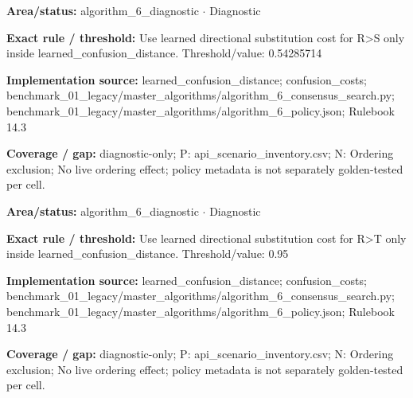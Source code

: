 \begin{tcolorbox}[enhanced,breakable,colback=white,colframe=Muted!45,boxrule=0.45pt,arc=1.5pt,left=6pt,right=6pt,top=5pt,bottom=5pt,title={\texttt{A6-LEARNED-SUBSTITUTION-R-S}},title after break={\texttt{A6-LEARNED-SUBSTITUTION-R-S}\ (continued)},fonttitle=\headingfont\bfseries\color{Navy},coltitle=Navy]
\textbf{Area/status:} algorithm\_\allowbreak{}6\_\allowbreak{}diagnostic $\boldsymbol{\cdot}$ Diagnostic\par
\smallskip
\textbf{Exact rule / threshold:} Use learned directional substitution cost for R>S only inside learned\_\allowbreak{}confusion\_\allowbreak{}distance. Threshold/\allowbreak{}value: 0.54285714\par
\smallskip
\textbf{Implementation source:} learned\_\allowbreak{}confusion\_\allowbreak{}distance; confusion\_\allowbreak{}costs; benchmark\_\allowbreak{}01\_\allowbreak{}legacy/\allowbreak{}master\_\allowbreak{}algorithms/\allowbreak{}algorithm\_\allowbreak{}6\_\allowbreak{}consensus\_\allowbreak{}search.py; benchmark\_\allowbreak{}01\_\allowbreak{}legacy/\allowbreak{}master\_\allowbreak{}algorithms/\allowbreak{}algorithm\_\allowbreak{}6\_\allowbreak{}policy.json; Rulebook 14.3\par
\smallskip
\textbf{Coverage / gap:} diagnostic-only; P: api\_\allowbreak{}scenario\_\allowbreak{}inventory.csv; N: Ordering exclusion; No live ordering effect; policy metadata is not separately golden-tested per cell.
\end{tcolorbox}
\begin{tcolorbox}[enhanced,breakable,colback=white,colframe=Muted!45,boxrule=0.45pt,arc=1.5pt,left=6pt,right=6pt,top=5pt,bottom=5pt,title={\texttt{A6-LEARNED-SUBSTITUTION-R-T}},title after break={\texttt{A6-LEARNED-SUBSTITUTION-R-T}\ (continued)},fonttitle=\headingfont\bfseries\color{Navy},coltitle=Navy]
\textbf{Area/status:} algorithm\_\allowbreak{}6\_\allowbreak{}diagnostic $\boldsymbol{\cdot}$ Diagnostic\par
\smallskip
\textbf{Exact rule / threshold:} Use learned directional substitution cost for R>T only inside learned\_\allowbreak{}confusion\_\allowbreak{}distance. Threshold/\allowbreak{}value: 0.95\par
\smallskip
\textbf{Implementation source:} learned\_\allowbreak{}confusion\_\allowbreak{}distance; confusion\_\allowbreak{}costs; benchmark\_\allowbreak{}01\_\allowbreak{}legacy/\allowbreak{}master\_\allowbreak{}algorithms/\allowbreak{}algorithm\_\allowbreak{}6\_\allowbreak{}consensus\_\allowbreak{}search.py; benchmark\_\allowbreak{}01\_\allowbreak{}legacy/\allowbreak{}master\_\allowbreak{}algorithms/\allowbreak{}algorithm\_\allowbreak{}6\_\allowbreak{}policy.json; Rulebook 14.3\par
\smallskip
\textbf{Coverage / gap:} diagnostic-only; P: api\_\allowbreak{}scenario\_\allowbreak{}inventory.csv; N: Ordering exclusion; No live ordering effect; policy metadata is not separately golden-tested per cell.
\end{tcolorbox}

